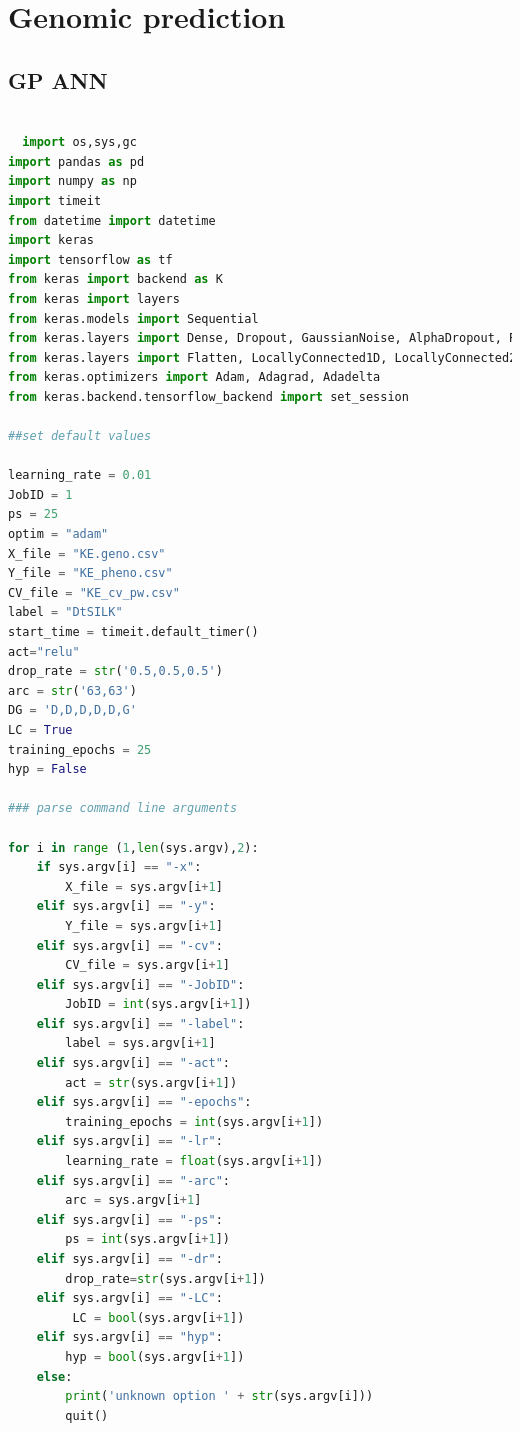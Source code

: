 

\chapter{Genomic prediction} %

\label{AppendixC} %

\section{GP ANN}
\begin{lstlisting}[language=Python]

  import os,sys,gc
import pandas as pd
import numpy as np
import timeit
from datetime import datetime
import keras
import tensorflow as tf
from keras import backend as K
from keras import layers
from keras.models import Sequential
from keras.layers import Dense, Dropout, GaussianNoise, AlphaDropout, Reshape
from keras.layers import Flatten, LocallyConnected1D, LocallyConnected2D
from keras.optimizers import Adam, Adagrad, Adadelta
from keras.backend.tensorflow_backend import set_session 

##set default values

learning_rate = 0.01
JobID = 1
ps = 25
optim = "adam"
X_file = "KE.geno.csv"
Y_file = "KE_pheno.csv"
CV_file = "KE_cv_pw.csv"
label = "DtSILK"
start_time = timeit.default_timer()
act="relu"
drop_rate = str('0.5,0.5,0.5')
arc = str('63,63')
DG = 'D,D,D,D,D,G'
LC = True
training_epochs = 25
hyp = False

### parse command line arguments

for i in range (1,len(sys.argv),2):
    if sys.argv[i] == "-x":
        X_file = sys.argv[i+1]
    elif sys.argv[i] == "-y":
        Y_file = sys.argv[i+1]
    elif sys.argv[i] == "-cv":
        CV_file = sys.argv[i+1]
    elif sys.argv[i] == "-JobID":
        JobID = int(sys.argv[i+1])
    elif sys.argv[i] == "-label":
        label = sys.argv[i+1]
    elif sys.argv[i] == "-act":
        act = str(sys.argv[i+1])
    elif sys.argv[i] == "-epochs":
        training_epochs = int(sys.argv[i+1])
    elif sys.argv[i] == "-lr":
        learning_rate = float(sys.argv[i+1])
    elif sys.argv[i] == "-arc":
        arc = sys.argv[i+1]
    elif sys.argv[i] == "-ps":
        ps = int(sys.argv[i+1])
    elif sys.argv[i] == "-dr":
        drop_rate=str(sys.argv[i+1])
    elif sys.argv[i] == "-LC":
         LC = bool(sys.argv[i+1])
    elif sys.argv[i] == "hyp":
        hyp = bool(sys.argv[i+1])
    else:
        print('unknown option ' + str(sys.argv[i]))
        quit()


\end{lstlisting}
